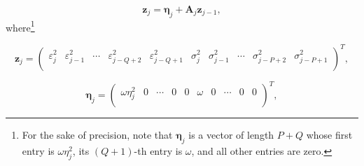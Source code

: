\documentclass{rQUF2e}
\theoremstyle{plain}
\theoremstyle{definition}
\theoremstyle{remark}
\begin{document}
\begin{equation}
    \mathbf{z}_j = \boldsymbol{\eta}_j + \mathbf{A}_j \mathbf{z}_{j - 1},
    \label{eq:markov_rep_garch}
\end{equation}
where\footnote{For the sake of precision, note that $\boldsymbol{\eta}_j$ is a vector of length $P+Q$ whose first entry is $\omega \eta_j^2$, its $(Q+1)$-th entry is $\omega$, and all other entries are zero.}

\[
    \mathbf{z}_j =
    \begin{pmatrix}
        \varepsilon_j^2 & \varepsilon_{j - 1}^2 & \cdots & \varepsilon_{j - Q + 2}^2 & \varepsilon_{j - Q + 1}^2 & \sigma^2_{j} & \sigma^2_{j - 1} & \cdots & \sigma^2_{j - P + 2} & \sigma^2_{j - P + 1} \\
    \end{pmatrix}^T,
\]


\[
    \mathbf{\eta}_j =
    \begin{pmatrix}
        \omega \eta_j^2 & 0 & \cdots & 0 & 0 & \omega & 0 & \cdots & 0 & 0 \\
    \end{pmatrix}^T,
\]
\end{document}
